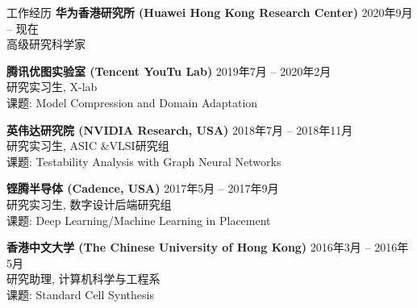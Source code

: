
\begin{rSection}{工作经历}
{\bf 华为香港研究所 (Huawei Hong Kong Research Center)}         \hfill { 2020年9月 -- 现在} \\
高级研究科学家

{\bf 腾讯优图实验室 (Tencent YouTu Lab)}         \hfill { 2019年7月 -- 2020年2月} \\
研究实习生, X-lab\\
课题: Model Compression and Domain Adaptation

{\bf 英伟达研究院 (NVIDIA Research, USA)}               \hfill { 2018年7月 -- 2018年11月} \\
研究实习生, ASIC \&VLSI研究组\\
课题: Testability Analysis with Graph Neural Networks

{\bf 铿腾半导体 (Cadence, USA)}               \hfill {2017年5月 -- 2017年9月} \\
研究实习生, 数字设计后端研究组\\
课题: Deep Learning/Machine Learning in Placement

{\bf 香港中文大学 (The Chinese University of Hong Kong)}  \hfill {2016年3月 -- 2016年5月} \\
研究助理, 计算机科学与工程系 \\
课题: Standard Cell Synthesis

\end{rSection}


